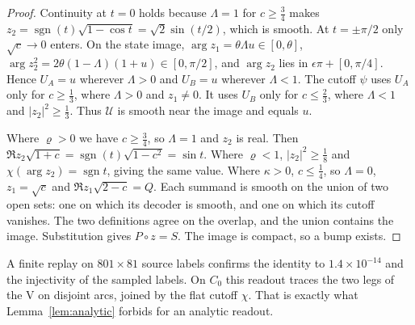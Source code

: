 \documentclass[11pt]{article}
\theoremstyle{definition}\newtheorem{definition}[theorem]{Definition}
\theoremstyle{remark}\newtheorem{remark}[theorem]{Remark}
\begin{document}
\begin{proof}
Continuity at $t=0$ holds because $\Lambda=1$ for $c\geq\frac34$ makes
$z_2=\operatorname{sgn}(t)\sqrt{1-\cos t}=\sqrt2\sin(t/2)$, which is smooth. At
$t=\pm\pi/2$ only $\sqrt c\to0$ enters. On the state image, $\arg z_1=\theta\Lambda u\in[0,\theta]$,
$\arg z_2^2=2\theta(1-\Lambda)(1+u)\in[0,\pi/2]$, and $\arg z_2$ lies in
$\epsilon\pi+[0,\pi/4]$. Hence $U_A=u$ wherever $\Lambda>0$ and $U_B=u$ wherever
$\Lambda<1$. The cutoff $\psi$ uses $U_A$ only for $c\geq\frac13$, where
$\Lambda>0$ and $z_1\neq0$. It uses $U_B$ only for $c\leq\frac23$, where
$\Lambda<1$ and $|z_2|^2\geq\frac13$. Thus $\mathcal U$ is smooth near the image
and equals $u$.

Where $\varrho>0$ we have $c\geq\frac34$, so $\Lambda=1$ and $z_2$ is real.
Then $\Re z_2\sqrt{1+c}=\operatorname{sgn}(t)\sqrt{1-c^2}=\sin t$. Where
$\varrho<1$, $|z_2|^2\geq\frac18$ and $\chi(\arg z_2)=\operatorname{sgn}t$, giving the
same value. Where $\kappa>0$, $c\leq\frac14$, so $\Lambda=0$, $z_1=\sqrt c$
and $\Re z_1\sqrt{2-c}=Q$. Each summand is smooth on the union of two open
sets: one on which its decoder is smooth, and one on which its cutoff vanishes.
The two definitions agree on the overlap, and the union contains the image.
Substitution gives $P\circ z=S$. The image is compact, so a bump exists.
\end{proof}

A finite replay on $801\times81$ source labels confirms the identity to
$1.4\times10^{-14}$ and the injectivity of the sampled labels. On $C_0$ this
readout traces the two legs of the V on disjoint arcs, joined by the flat
cutoff $\chi$. That is exactly what Lemma~\ref{lem:analytic} forbids for an
analytic readout.
\end{document}
